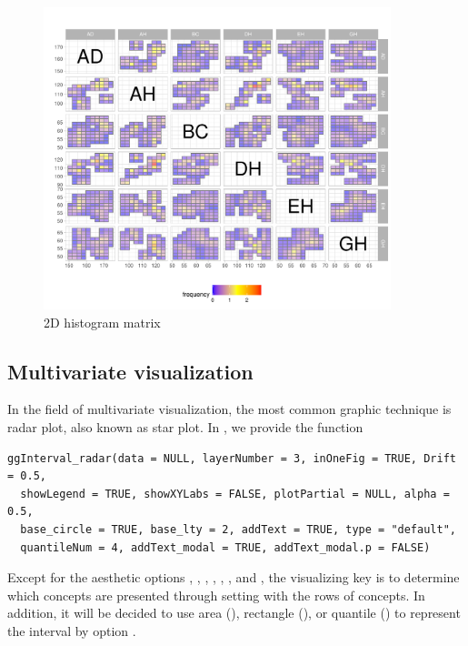 \documentclass[article]{jss}
\begin{document}
\begin{figure}[htbp]
\centering
\includegraphics[width=0.9\textwidth]{ggESDA_Jiang&Wu_20210915-2DhistMatrix.pdf
}
\caption{\label{fig:2DhistMatrix} 2D histogram matrix}
\end{figure}


\subsection{Multivariate visualization}

In the field of multivariate visualization, the most common graphic technique is radar plot, also known as star plot. In , we provide the function

\begin{verbatim}
ggInterval_radar(data = NULL, layerNumber = 3, inOneFig = TRUE, Drift = 0.5, 
  showLegend = TRUE, showXYLabs = FALSE, plotPartial = NULL, alpha = 0.5, 
  base_circle = TRUE, base_lty = 2, addText = TRUE, type = "default",
  quantileNum = 4, addText_modal = TRUE, addText_modal.p = FALSE)
\end{verbatim}

Except for the aesthetic options , , , , , , and , the visualizing key is to determine which concepts are presented through setting  with the rows of concepts. In addition, it will be decided to use area (), rectangle (), or quantile () to represent the interval by option .
\end{document}

